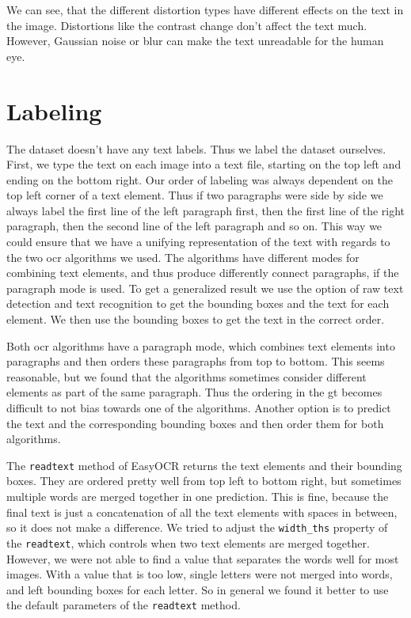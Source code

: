 We can see, that the different distortion types have different effects on the text in the image.
Distortions like the contrast change don't affect the text much.
However, Gaussian noise or blur can make the text unreadable for the human eye.

\section{Labeling}
\label{sec:dataset_labeling}

The dataset doesn't have any text labels.
Thus we label the dataset ourselves.
First, we type the text on each image into a text file, starting on the top left and ending on the bottom right.
Our order of labeling was always dependent on the top left corner of a text element.
Thus if two paragraphs were side by side we always label the first line of the left paragraph first, then the first line of the right paragraph, then the second line of the left paragraph and so on.
This way we could ensure that we have a unifying representation of the text with regards to the two \gls{ocr} algorithms we used.
The algorithms have different modes for combining text elements, and thus produce differently connect paragraphs, if the paragraph mode is used.
To get a generalized result we use the option of raw text detection and text recognition to get the bounding boxes and the text for each element.
We then use the bounding boxes to get the text in the correct order.

Both \gls{ocr} algorithms have a paragraph mode, which combines text elements into paragraphs and then orders these paragraphs from top to bottom.
This seems reasonable, but we found that the algorithms sometimes consider different elements as part of the same paragraph.
Thus the ordering in the \gls{gt} becomes difficult to not bias towards one of the algorithms.
Another option is to predict the text and the corresponding bounding boxes and then order them for both algorithms.

The \texttt{readtext} method of EasyOCR returns the text elements and their bounding boxes.
They are ordered pretty well from top left to bottom right, but sometimes multiple words are merged together in one prediction.
This is fine, because the final text is just a concatenation of all the text elements with spaces in between, so it does not make a difference.
We tried to adjust the \texttt{width\_ths} property of the \texttt{readtext}, which controls when two text elements are merged together.
However, we were not able to find a value that separates the words well for most images.
With a value that is too low, single letters were not merged into words, and left bounding boxes for each letter.
So in general we found it better to use the default parameters of the \texttt{readtext} method.

